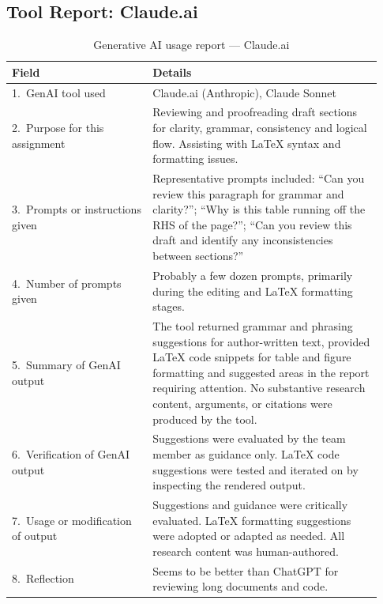 
\subsection*{Tool Report: Claude.ai}

\begin{table}[H]
\renewcommand{\arraystretch}{1.4}
\begin{tabular}{|p{0.35\linewidth}|p{0.58\linewidth}|}
    \hline
    \textbf{Field} & \textbf{Details} \\
    \hline

    1.\ GenAI tool used
    & Claude.ai (Anthropic), Claude Sonnet \\
    \hline

    2.\ Purpose for this assignment
    & Reviewing and proofreading draft sections for clarity,
      grammar, consistency and logical flow. Assisting with \LaTeX{} syntax
      and formatting issues. \\
    \hline

    3.\ Prompts or instructions given
    & Representative prompts included: ``Can you review this
      paragraph for grammar and clarity?''; ``Why is this table running off the RHS of the page?''; ``Can you review this draft and identify any inconsistencies between sections?'' \\
    \hline

    4.\ Number of prompts given
    & Probably a few dozen prompts, primarily
      during the editing and \LaTeX{} formatting stages. \\
    \hline

    5.\ Summary of GenAI output
    & The tool returned grammar and phrasing suggestions for
      author-written text, provided \LaTeX{} code snippets
      for table and figure formatting and suggested areas in the report requiring attention. No substantive research
      content, arguments, or citations were produced by the tool. \\
    \hline

    6.\ Verification of GenAI output
    & Suggestions were evaluated by the
      team member as guidance only.
      \LaTeX{} code suggestions were tested and iterated on by inspecting the rendered output.  \\
    \hline

    7.\ Usage or modification of output
    & Suggestions and guidance were critically evaluated. \LaTeX{}
      formatting suggestions were adopted or adapted as needed.
      All research content was human-authored. \\
    \hline

    8.\ Reflection
    & Seems to be better than ChatGPT for reviewing long documents and code. \\
    \hline

\end{tabular}
\caption{Generative AI usage report --- Claude.ai}
\end{table}

